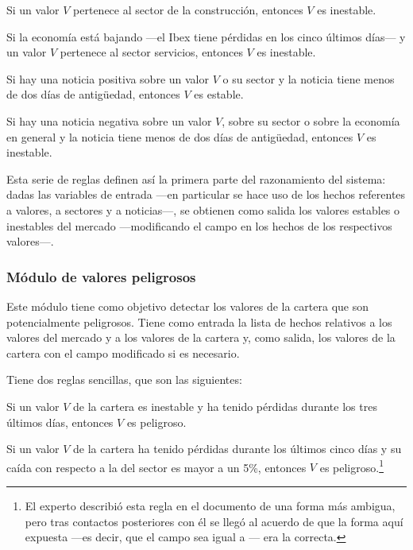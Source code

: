 \documentclass[a4paper, 11pt, titlepage]{article}
\begin{document}
    \begin{regla}
        Si un valor $V$ pertenece al sector de la construcción, entonces $V$ es inestable.
    \end{regla}

    \begin{regla}
        Si la economía está bajando ---el Ibex tiene pérdidas en los cinco últimos días--- y un valor $V$ pertenece al sector servicios, entonces $V$ es inestable.
    \end{regla}

    \begin{regla}
        Si hay una noticia positiva sobre un valor $V$ o su sector y la noticia tiene menos de dos días de antigüedad, entonces $V$ es estable.
    \end{regla}

    \begin{regla}
        Si hay una noticia negativa sobre un valor $V$, sobre su sector o sobre la economía en general y la noticia tiene menos de dos días de antigüedad, entonces $V$ es inestable.
    \end{regla}

    Esta serie de reglas definen así la primera parte del razonamiento del sistema: dadas las variables de entrada ---en particular se hace uso de los hechos referentes a valores, a sectores y a noticias---, se obtienen como salida los valores estables o inestables del mercado ---modificando el campo  en los hechos de los respectivos valores---.

    \subsubsection{Módulo de valores peligrosos}
    Este módulo tiene como objetivo detectar los valores de la cartera que son potencialmente peligrosos. Tiene como entrada la lista de hechos relativos a los valores del mercado y a los valores de la cartera y, como salida, los valores de la cartera con el campo  modificado si es necesario.

    Tiene dos reglas sencillas, que son las siguientes:

    \begin{regla}
        Si un valor $V$ de la cartera es inestable y ha tenido pérdidas durante los tres últimos días, entonces $V$ es peligroso.
    \end{regla}

    \begin{regla}
        Si un valor $V$ de la cartera ha tenido pérdidas durante los últimos cinco días y su caída con respecto a la del sector es mayor a un 5\%, entonces $V$ es peligroso.\footnote{El experto describió esta regla en el documento de una forma más ambigua, pero tras contactos posteriores con él se llegó al acuerdo de que la forma aquí expuesta ---es decir, que el campo  sea igual a --- era la correcta.}
    \end{regla}
\end{document}
